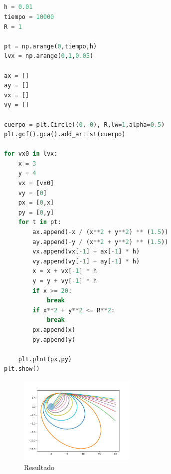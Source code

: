 \documentclass{article}
\begin{document}
\subsection{}
\begin{lstlisting}[language=Python,caption=1\_2.py]
h = 0.01
tiempo = 10000
R = 1

pt = np.arange(0,tiempo,h)
lvx = np.arange(0,1,0.05)

ax = []
ay = []
vx = []
vy = []

cuerpo = plt.Circle((0, 0), R,lw=1,alpha=0.5)
plt.gcf().gca().add_artist(cuerpo)

for vx0 in lvx:
    x = 3
    y = 4
    vx = [vx0]
    vy = [0]
    px = [0,x]
    py = [0,y]
    for t in pt:
        ax.append(-x / (x**2 + y**2) ** (1.5))
        ay.append(-y / (x**2 + y**2) ** (1.5))
        vx.append(vx[-1] + ax[-1] * h)
        vy.append(vy[-1] + ay[-1] * h)
        x = x + vx[-1] * h
        y = y + vy[-1] * h
        if x >= 20:
            break
        if x**2 + y**2 <= R**2:
            break
        px.append(x)
        py.append(y)

    plt.plot(px,py)
plt.show()
\end{lstlisting}
\begin{figure}[H]
    \centering
    \includegraphics[width=0.5\textwidth]{1_2.png}
    \caption{Resultado}
\end{figure}
\end{document}
